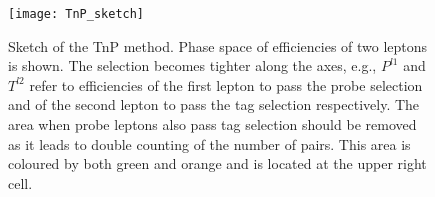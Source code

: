 

 \begin{figure}[H]
  \centering
  \texttt{[image: TnP\_sketch]}
  \caption{Sketch of the TnP method. Phase space of efficiencies of two leptons is shown. The selection becomes tighter along the axes, e.g., $P^{l1}$ and $T^{l2}$ refer to efficiencies of the first lepton to pass the probe selection and of the second lepton to pass the tag selection respectively. The area when probe leptons also pass tag selection should be removed as it leads to double counting of the number of pairs. This area is coloured by both green and orange and is located at the upper right cell. }\label{TnP_sketch}
\end{figure}

\fi
